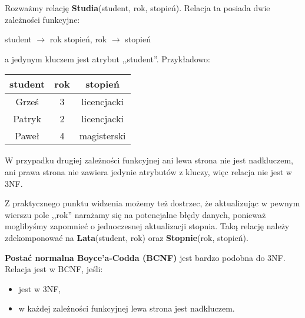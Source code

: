 \begin{example}
Rozważmy relację \textbf{Studia}(student, rok, stopień). Relacja ta posiada dwie zależności funkcyjne:
\begin{center}
    student $\to$ rok stopień, \qquad rok $\to$ stopień
\end{center} a jedynym kluczem jest atrybut ,,student''. Przykładowo:
\begin{center}
    \begin{tabular}{c|c|c}
     student & rok & stopień \\
     \hline
     Grześ & 3 & licencjacki \\
     Patryk & 2 & licencjacki \\
     Paweł & 4 & magisterski \\
    \end{tabular}
\end{center}

W przypadku drugiej zależności funkcyjnej ani lewa strona nie jest nadkluczem, ani prawa strona nie zawiera jedynie atrybutów z kluczy, więc relacja nie jest w 3NF.

Z praktycznego punktu widzenia możemy też dostrzec, że aktualizując w pewnym wierszu pole ,,rok'' narażamy się na potencjalne błędy danych, ponieważ moglibyśmy zapomnieć o jednoczesnej aktualizacji stopnia. Taką relację należy zdekomponować na \textbf{Lata}(student, rok) oraz \textbf{Stopnie}(rok, stopień).
\end{example}

\textbf{Postać normalna Boyce’a-Codda (BCNF)} jest bardzo podobna do 3NF. Relacja jest w BCNF, jeśli:
\begin{itemize}
    \item jest w 3NF,
    \item w każdej zależności funkcyjnej lewa strona jest nadkluczem.
\end{itemize}

